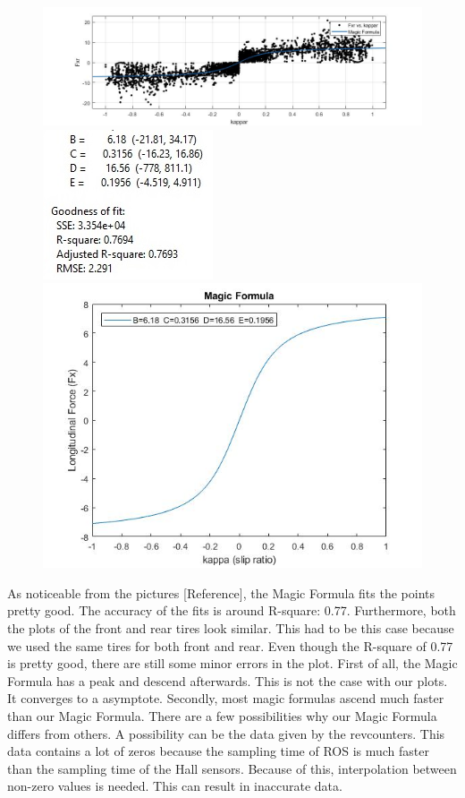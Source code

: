 \begin{figure}
	\centering
		\includegraphics[scale=0.2]{figure/MagicFormulaRearBags}
		\includegraphics[scale=0.2]{figure/MagicFormulaRearBagsFitnumbers}
		\includegraphics[scale=0.2]{figure/MagicFormulaRearBagsPic}
\end{figure}
As noticeable from the pictures [Reference], the Magic Formula fits the points pretty good. The accuracy of the fits is around R-square: 0.77. Furthermore, both the plots of the front and rear tires look similar. This had to be this case because we used the same tires for both front and rear. 
Even though the R-square of 0.77 is pretty good, there are still some minor errors in the plot. First of all, the Magic Formula has a peak and descend afterwards. This is not the case with our plots. It converges to a asymptote. Secondly, most magic formulas ascend much faster than our Magic Formula.
	There are a few possibilities why our Magic Formula differs from others. A possibility can be the data given by the revcounters. This data contains a lot of zeros because the sampling time of ROS is much faster than the sampling time of the Hall sensors. Because of this, interpolation between non-zero values is needed. This can result in inaccurate data. 


